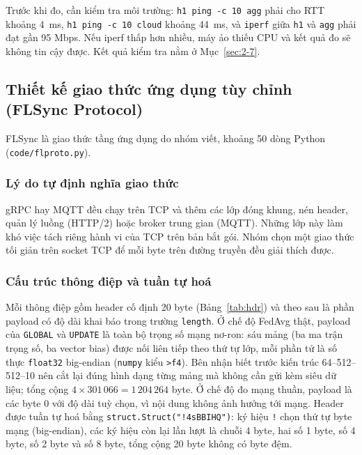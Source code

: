 Trước khi đo, cần kiểm tra môi trường: \texttt{h1 ping -c 10 agg} phải cho RTT khoảng 4~ms, \texttt{h1 ping -c 10 cloud} khoảng 44~ms, và \texttt{iperf} giữa \texttt{h1} và \texttt{agg} phải đạt gần 95 Mbps. Nếu iperf thấp hơn nhiều, máy ảo thiếu CPU và kết quả đo sẽ không tin cậy được. Kết quả kiểm tra nằm ở Mục~\ref{sec:2-7}.

\subsection{Thiết kế giao thức ứng dụng tùy chỉnh (FLSync Protocol)}
\label{sec:2-4}
FLSync là giao thức tầng ứng dụng do nhóm viết, khoảng 50 dòng Python (\texttt{code/flproto.py}).

\subsubsection{Lý do tự định nghĩa giao thức}
gRPC hay MQTT đều chạy trên TCP và thêm các lớp đóng khung, nén header, quản lý luồng (HTTP/2) hoặc broker trung gian (MQTT). Những lớp này làm khó việc tách riêng hành vi của TCP trên bản bắt gói. Nhóm chọn một giao thức tối giản trên socket TCP để mỗi byte trên đường truyền đều giải thích được.

\subsubsection{Cấu trúc thông điệp và tuần tự hoá}
Mỗi thông điệp gồm header cố định 20 byte (Bảng~\ref{tab:hdr}) và theo sau là phần payload có độ dài khai báo trong trường \texttt{length}. Ở chế độ FedAvg thật, payload của \texttt{GLOBAL} và \texttt{UPDATE} là toàn bộ trọng số mạng nơ-ron: sáu mảng (ba ma trận trọng số, ba vector bias) được nối liên tiếp theo thứ tự lớp, mỗi phần tử là số thực \texttt{float32} big-endian (\texttt{numpy} kiểu \texttt{>f4}). Bên nhận biết trước kiến trúc 64--512--512--10 nên cắt lại đúng hình dạng từng mảng mà không cần gửi kèm siêu dữ liệu; tổng cộng $4 \times 301\,066 = 1\,204\,264$ byte. Ở chế độ đo mạng thuần, payload là các byte 0 với độ dài tuỳ chọn, vì nội dung không ảnh hưởng tới mạng. Header được tuần tự hoá bằng \texttt{struct.Struct("!4sBBIHQ")}: ký hiệu \texttt{!} chọn thứ tự byte mạng (big-endian), các ký hiệu còn lại lần lượt là chuỗi 4 byte, hai số 1 byte, số 4 byte, số 2 byte và số 8 byte, tổng cộng 20 byte không có byte đệm.

